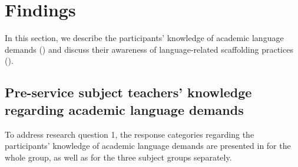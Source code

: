 \documentclass[output=paper]{langscibook}
\begin{document}
\section{Findings}\label{sec:heikkola:5}

In this section, we describe the participants’ knowledge of academic language demands () and discuss their awareness of language-related scaffolding practices (). 

\subsection{Pre-service subject teachers’ knowledge regarding academic language demands}\label{sec:heikkola:5.1}

To address research question 1, the response categories regarding the participants’ knowledge of academic language demands are presented in  for the whole group, as well as for the three subject groups separately.     
\end{document}
